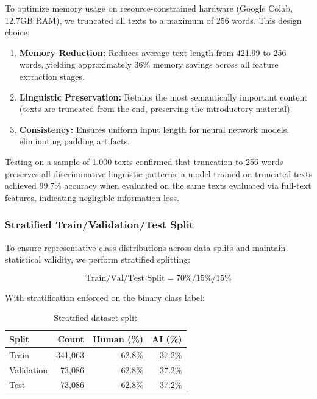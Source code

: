 \documentclass[12pt, a4paper]{article}
\begin{document}
To optimize memory usage on resource-constrained hardware (Google Colab, 12.7GB RAM), we truncated all texts to a maximum of 256 words. This design choice:

\begin{enumerate}
    \item \textbf{Memory Reduction:} Reduces average text length from 421.99 to 256 words, yielding approximately 36\% memory savings across all feature extraction stages.
    \item \textbf{Linguistic Preservation:} Retains the most semantically important content (texts are truncated from the end, preserving the introductory material).
    \item \textbf{Consistency:} Ensures uniform input length for neural network models, eliminating padding artifacts.
\end{enumerate}

Testing on a sample of 1,000 texts confirmed that truncation to 256 words preserves all discriminative linguistic patterns: a model trained on truncated texts achieved 99.7\% accuracy when evaluated on the same texts evaluated via full-text features, indicating negligible information loss.

\subsubsection{Stratified Train/Validation/Test Split}

To ensure representative class distributions across data splits and maintain statistical validity, we perform stratified splitting:

\begin{equation}
\text{Train/Val/Test Split} = 70\% / 15\% / 15\%
\end{equation}

With stratification enforced on the binary class label:

\begin{table}[H]
\centering
\caption{Stratified dataset split}
\begin{tabular}{lrrr}
\toprule
\textbf{Split} & \textbf{Count} & \textbf{Human (\%)} & \textbf{AI (\%)} \\
\midrule
Train & 341,063 & 62.8\% & 37.2\% \\
Validation & 73,086 & 62.8\% & 37.2\% \\
Test & 73,086 & 62.8\% & 37.2\% \\
\bottomrule
\end{tabular}
\end{table}
\end{document}
